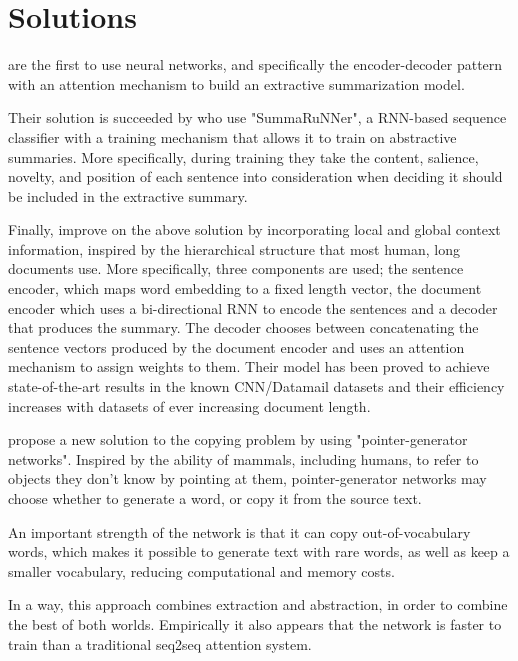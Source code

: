 \documentclass{article}
\begin{document}
	\section{Solutions}
	
	\cite{lapata} are the first to use neural networks, and specifically the encoder-decoder pattern with an attention mechanism to build an extractive summarization model. 
	
	Their solution is succeeded by \cite{nallapati} who use "SummaRuNNer", a RNN-based sequence classifier with a training mechanism that allows it to train on abstractive summaries. More specifically, during training they take the content, salience, novelty, and position of each sentence into consideration when deciding it should be included in the extractive summary. 
	
	Finally, \cite{xiao} improve on the above solution by incorporating local and global context information, inspired by the hierarchical structure that most human, long documents use. More specifically, three components are used; the sentence encoder, which maps word embedding to a fixed length vector, the document encoder which uses a bi-directional RNN to encode the sentences and a decoder that produces the summary. The decoder chooses between concatenating the sentence vectors produced by the document encoder and uses an attention mechanism to assign weights to them. Their model has been proved to achieve state-of-the-art results in the known CNN/Datamail datasets and their efficiency increases  with datasets of ever increasing document length. \par
	
	
	\cite{abigail} propose a new solution to the copying problem by using "pointer-generator networks". Inspired by the ability of mammals, including humans, to refer to objects they don't know by pointing at them, pointer-generator networks may choose whether to generate a word, or copy it from the source text. 
	
	An important strength of the network is that it can copy out-of-vocabulary words, which makes it possible to generate text with rare words, as well as keep a smaller vocabulary, reducing computational and memory costs.
	
	In a way, this approach combines extraction and abstraction, in order to combine the best of both worlds. Empirically it also appears that the network is faster to train than a traditional seq2seq attention system. \par
	
	
	\printbibliography
	
	
\end{document}
